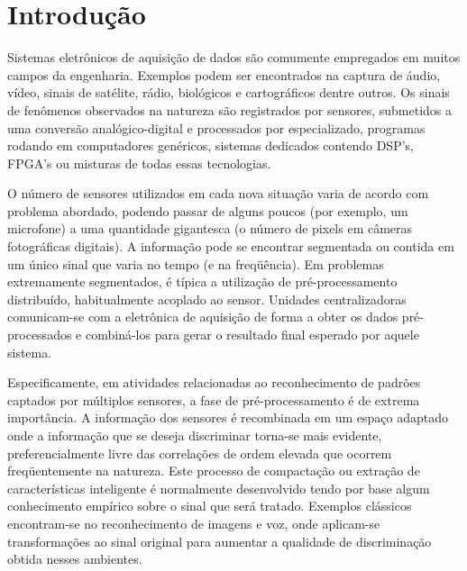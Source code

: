 \typeout{ ====================================================================}
\typeout{ ====================================================================}

\chapter{Introdução}

Sistemas eletrônicos de aquisição de dados são comumente empregados em muitos
campos da engenharia. Exemplos podem ser encontrados na captura de áudio,
vídeo, sinais de satélite, rádio, biológicos e cartográficos dentre outros. Os
sinais de fenômenos observados na natureza são registrados por sensores,
submetidos a uma conversão analógico-digital e processados por 
especializado, programas rodando em computadores genéricos, sistemas dedicados
contendo DSP's, FPGA's ou misturas de todas essas tecnologias.

O número de sensores utilizados em cada nova situação varia de acordo com
problema abordado, podendo passar de alguns poucos (por exemplo, um microfone)
a uma quantidade gigantesca (o número de pixels em câmeras fotográficas
digitais). A informação pode se encontrar segmentada ou contida em um único
sinal que varia no tempo (e na freqüência). Em problemas extremamente
segmentados, é típica a utilização de pré-processamento distribuído,
habitualmente acoplado ao sensor. Unidades centralizadoras comunicam-se com a
eletrônica de aquisição de forma a obter os dados pré-processados e
combiná-los para gerar o resultado final esperado por aquele sistema.

Especificamente, em atividades relacionadas ao reconhecimento de padrões
captados por múltiplos sensores, a fase de pré-processamento é de extrema
importância. A informação dos sensores é recombinada em um espaço adaptado
onde a informação que se deseja discriminar torna-se mais evidente,
preferencialmente livre das correlações de ordem elevada que ocorrem
freqüentemente na natureza. Este processo de compactação ou extração de
características inteligente é normalmente desenvolvido tendo por base algum
conhecimento empírico sobre o sinal que será tratado. Exemplos clássicos
encontram-se no reconhecimento de imagens e voz, onde aplicam-se
transformações ao sinal original para aumentar a qualidade de discriminação
obtida nesses ambientes.


